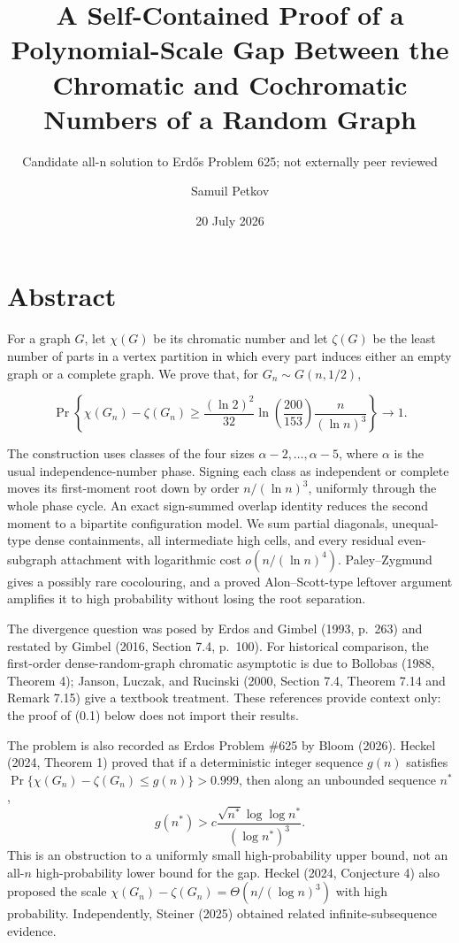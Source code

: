 \documentclass[
  11pt,
  a4paper,
]{article}
\title{A Self-Contained Proof of a Polynomial-Scale Gap Between the
Chromatic and Cochromatic Numbers of a Random Graph}
\subtitle{Candidate all-n solution to Erd\H{o}s Problem 625; not
externally peer reviewed}
\author{Samuil Petkov}
\date{20 July 2026}
\begin{document}
\maketitle

{
\setcounter{tocdepth}{1}
\tableofcontents
}
\clearpage

\section*{Abstract}\label{abstract}

For a graph \(G\), let \(\chi(G)\) be its chromatic number and let
\(\zeta(G)\) be the least number of parts in a vertex partition in which
every part induces either an empty graph or a complete graph. We prove
that, for \(G_n\sim G(n,1/2)\),

\[
 \Pr\left\{\chi(G_n)-\zeta(G_n)
 \ge \frac{(\ln 2)^2}{32}\ln\!\left(\frac{200}{153}\right)
       \frac{n}{(\ln n)^3}\right\}\longrightarrow1.      \tag{0.1}
\]

The construction uses classes of the four sizes
\(\alpha-2,\ldots,\alpha-5\), where \(\alpha\) is the usual
independence-number phase. Signing each class as independent or complete
moves its first-moment root down by order \(n/(\ln n)^3\), uniformly
through the whole phase cycle. An exact sign-summed overlap identity
reduces the second moment to a bipartite configuration model. We sum
partial diagonals, unequal-type dense containments, all intermediate
high cells, and every residual even-subgraph attachment with logarithmic
cost \(o(n/(\ln n)^4)\). Paley--Zygmund gives a possibly rare
cocolouring, and a proved Alon--Scott-type leftover argument amplifies
it to high probability without losing the root separation.

The divergence question was posed by Erdos and Gimbel (1993, p.~263) and
restated by Gimbel (2016, Section 7.4, p.~100). For historical
comparison, the first-order dense-random-graph chromatic asymptotic is
due to Bollobas (1988, Theorem 4); Janson, Luczak, and Rucinski (2000,
Section 7.4, Theorem 7.14 and Remark 7.15) give a textbook treatment.
These references provide context only: the proof of (0.1) below does not
import their results.

The problem is also recorded as Erdos Problem \#625 by Bloom (2026).
Heckel (2024, Theorem 1) proved that if a deterministic integer sequence
\(g(n)\) satisfies \(\Pr\{\chi(G_n)-\zeta(G_n)\le g(n)\}>0.999\), then
along an unbounded sequence \(n^*\), \[
 g(n^*)>c\frac{\sqrt{n^*}\log\log n^*}{(\log n^*)^3}.
\] This is an obstruction to a uniformly small high-probability upper
bound, not an all-\(n\) high-probability lower bound for the gap. Heckel
(2024, Conjecture 4) also proposed the scale
\(\chi(G_n)-\zeta(G_n)=\Theta(n/(\log n)^3)\) with high probability.
Independently, Steiner (2025) obtained related infinite-subsequence
evidence.
\end{document}
